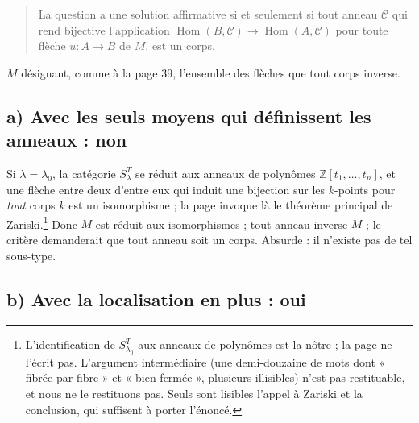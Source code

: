 \documentclass[11pt,a4paper]{article}
\begin{document}
\begin{quote}
La question a une solution affirmative si et seulement si tout anneau
$\mathcal{C}$ qui rend bijective l'application
$\operatorname{Hom}(B,\mathcal{C}) \to \operatorname{Hom}(A,\mathcal{C})$ pour
toute flèche $u : A \to B$ de $M$, est un corps.
\end{quote}

$M$ désignant, comme à la page 39, l'ensemble des flèches que tout corps
inverse.

\subsection*{a) Avec les seuls moyens qui définissent les anneaux : non}

Si $\lambda = \lambda_{0}$, la catégorie $S^{T}_{\lambda}$ se réduit aux
anneaux de polynômes $\mathbb{Z}[t_{1}, \ldots, t_{n}]$, et une flèche entre
deux d'entre eux qui induit une bijection sur les $k$-points pour \emph{tout}
corps $k$ est un isomorphisme ; la page invoque là le théorème principal de
Zariski.\footnote{L'identification de $S^{T}_{\lambda_{0}}$ aux anneaux de
polynômes est la nôtre ; la page ne l'écrit pas. L'argument intermédiaire (une
demi-douzaine de mots dont « fibrée par fibre » et « bien fermée », plusieurs
illisibles) n'est pas restituable, et nous ne le restituons pas. Seuls sont
lisibles l'appel à Zariski et la conclusion, qui suffisent à porter l'énoncé.}
Donc $M$ est réduit aux isomorphismes ; tout anneau inverse $M$ ; le critère
demanderait que tout anneau soit un corps. Absurde : il n'existe pas de tel
sous-type.

\subsection*{b) Avec la localisation en plus : oui}
\end{document}
